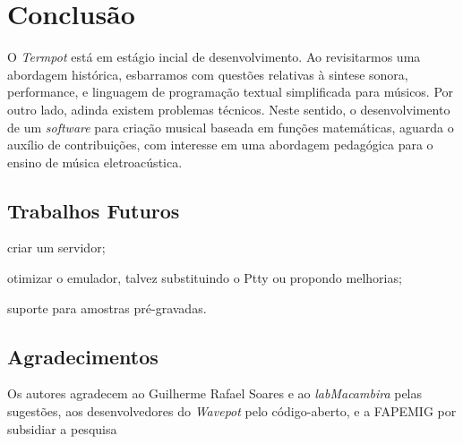 \section{Conclusão}\label{sec:conclusao}

O \emph{Termpot} está em estágio incial de desenvolvimento. Ao revisitarmos uma abordagem histórica, esbarramos com questões relativas à sintese sonora, performance, e linguagem de programação textual simplificada para músicos. Por outro lado, adinda existem problemas técnicos. Neste sentido, o desenvolvimento de um \emph{software} para criação musical baseada em funções matemáticas, aguarda o auxílio de contribuições, com interesse em uma abordagem pedagógica para o ensino de música eletroacústica.

\subsection{Trabalhos Futuros}

\begin{inparaenum}
\item criar um servidor;
\item otimizar o emulador, talvez substituindo o Ptty ou propondo melhorias;
\item suporte para amostras pré-gravadas.
\end{inparaenum}
\subsection{Agradecimentos}

Os autores agradecem ao Guilherme Rafael Soares e ao \emph{labMacambira} pelas sugestões, aos desenvolvedores do \emph{Wavepot} pelo código-aberto, e a FAPEMIG por subsidiar a pesquisa
